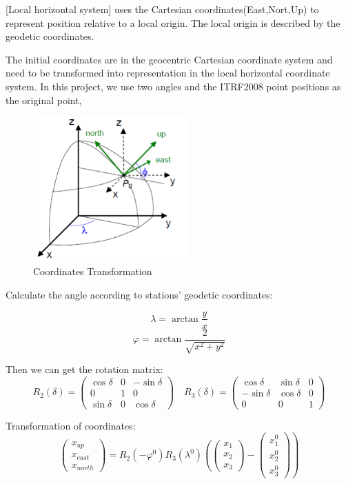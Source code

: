 \documentclass{article}
\begin{document}
[Local horizontal system] uses the Cartesian coordinates(East,Nort,Up) to represent position relative to a local origin. The local origin is described by the geodetic coordinates.

The initial coordinates are in the geocentric Cartesian coordinate system and need to be transformed into representation in the local horizontal coordinate system.
In this project, we use two angles and the ITRF2008 point positions as the original point, 
\begin{figure}[htbp]
  \centering
  \includegraphics[width=6cm]{../source/transform.png}
  \caption{Coordinates Transformation}
  \label{fig:2lhs}
\end{figure}

Calculate the angle according to stations' geodetic coordinates:

$$\lambda=\arctan\frac{y}{x}$$ 
$$\varphi=\arctan\frac{2}{\sqrt{x^{2}+y^{2}}}$$

Then we can get the rotation matrix:
$$R_2(\delta)=\begin{pmatrix}\cos\delta&0&-\sin\delta\\0&1&0\\\sin\delta&0&\cos\delta\end{pmatrix}\quad R_3(\delta)= \begin{pmatrix}\cos\delta&\sin\delta&0\\-\sin\delta&\cos\delta&0\\0&0&1\end{pmatrix}$$

Transformation of coordinates:
$$\left.\begin{pmatrix}x_{up}\\x_{east}\\x_{north}\end{pmatrix}=R_2(-\varphi^0)R_3(\lambda^0)\left(\begin{pmatrix}x_1\\x_2\\x_3\end{pmatrix}\right.-\begin{pmatrix}x_1^0\\x_2^0\\x_3^0\end{pmatrix}\right)$$
\end{document}
